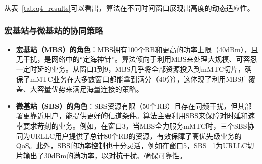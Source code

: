 从表~\ref{tab:q4_results}可以看出，算法在不同时间窗口展现出高度的动态适应性。
\subsubsection{宏基站与微基站的协同策略}
\begin{itemize}
    \item \textbf{宏基站（MBS）的角色}：MBS拥有100个RB和更高的功率上限（40dBm），且无干扰，是网络中的“定海神针”。算法倾向于利用MBS来处理大规模、可容忍一定时延的业务。从窗口1到9，MBS几乎将全部资源投入到mMTC切片，确保了mMTC业务在大多数窗口都能拿到满分（40分），这体现了利用MBS广覆盖、大容量优势来满足海量连接的策略。
    \item \textbf{微基站（SBS）的角色}：SBS资源有限（50个RB）且存在同频干扰，但其部署更靠近用户，能提供更好的信道条件。算法主要利用SBS来保障对时延和速率要求苛刻的业务。例如，在窗口3，当MBS全力服务mMTC时，三个SBS协同为URLLC用户提供了总计80个RB的资源，有效保障了高优先级业务的QoS。此外，SBS的功率控制也十分灵活，例如在窗口5，SBS\_1为URLLC切片输出了30dBm的满功率，以对抗干扰、确保可靠性。
\end{itemize}
